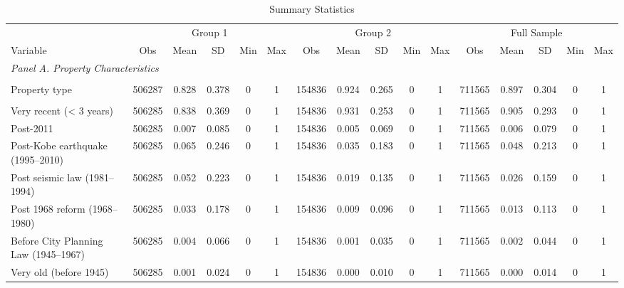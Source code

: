 \begin{table}[htbp]
\centering
\caption{Summary Statistics}
\label{tab:summary_stats}

\small
\begin{tabular}{l*{3}{ccccc}}
\toprule
& \multicolumn{5}{c}{Group 1}
& \multicolumn{5}{c}{Group 2}
& \multicolumn{5}{c}{Full Sample} \\
\cmidrule(lr){2-6}
\cmidrule(lr){7-11}
\cmidrule(lr){12-16}

Variable
& Obs & Mean & SD & Min & Max
& Obs & Mean & SD & Min & Max
& Obs & Mean & SD & Min & Max \\

\midrule

\multicolumn{16}{l}{\textit{Panel A. Property Characteristics}}\\
\addlinespace

\multicolumn{16}{l}{\quad \textit{Property Type}}\\
Property type
&506287&0.828&0.378&0&1
&154836&0.924&0.265&0&1
&711565&0.897&0.304&0&1\\

\addlinespace

\multicolumn{16}{l}{\quad \textit{Building Age Group}}\\

Very recent (< 3 years)
&506285&0.838&0.369&0&1
&154836&0.931&0.253&0&1
&711565&0.905&0.293&0&1\\

Post-2011
&506285&0.007&0.085&0&1
&154836&0.005&0.069&0&1
&711565&0.006&0.079&0&1\\

Post-Kobe earthquake (1995--2010)
&506285&0.065&0.246&0&1
&154836&0.035&0.183&0&1
&711565&0.048&0.213&0&1\\

Post seismic law (1981--1994)
&506285&0.052&0.223&0&1
&154836&0.019&0.135&0&1
&711565&0.026&0.159&0&1\\

Post 1968 reform (1968--1980)
&506285&0.033&0.178&0&1
&154836&0.009&0.096&0&1
&711565&0.013&0.113&0&1\\

Before City Planning Law (1945--1967)
&506285&0.004&0.066&0&1
&154836&0.001&0.035&0&1
&711565&0.002&0.044&0&1\\

Very old (before 1945)
&506285&0.001&0.024&0&1
&154836&0.000&0.010&0&1
&711565&0.000&0.014&0&1\\



\end{tabular}
\end{table}
